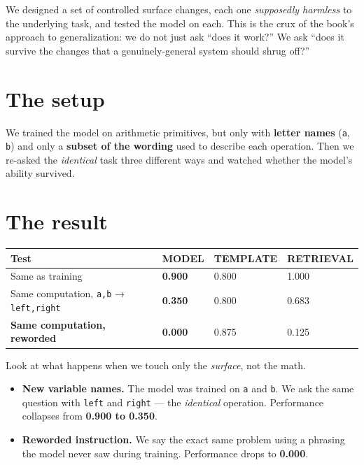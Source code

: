 We designed a set of controlled surface changes, each one
\emph{supposedly harmless} to the underlying task, and tested the model
on each. This is the crux of the book's approach to generalization: we
do not just ask ``does it work?'' We ask ``does it survive the changes
that a genuinely-general system should shrug off?''

\section{The setup}\label{the-setup}

We trained the model on arithmetic primitives, but only with
\textbf{letter names} (\texttt{a}, \texttt{b}) and only a \textbf{subset
of the wording} used to describe each operation. Then we re-asked the
\emph{identical} task three different ways and watched whether the
model's ability survived.

\section{The result}\label{the-result}

\begin{longtable}[]{@{}llll@{}}
\toprule\noalign{}
Test & \textbf{MODEL} & TEMPLATE & RETRIEVAL \\
\midrule\noalign{}
\endhead
\bottomrule\noalign{}
\endlastfoot
Same as training & \textbf{0.900} & 0.800 & 1.000 \\
Same computation, \texttt{a,b} → \texttt{left,right} & \textbf{0.350} &
0.800 & 0.683 \\
\textbf{Same computation, reworded} & \textbf{0.000} & 0.875 & 0.125 \\
\end{longtable}

Look at what happens when we touch only the \emph{surface}, not the
math.

\begin{itemize}
\item
  \textbf{New variable names.} The model was trained on \texttt{a} and
  \texttt{b}. We ask the same question with \texttt{left} and
  \texttt{right} --- the \emph{identical} operation. Performance
  collapses from \textbf{0.900 to 0.350}.
\item
  \textbf{Reworded instruction.} We say the exact same problem using a
  phrasing the model never saw during training. Performance drops to
  \textbf{0.000}.
\end{itemize}

